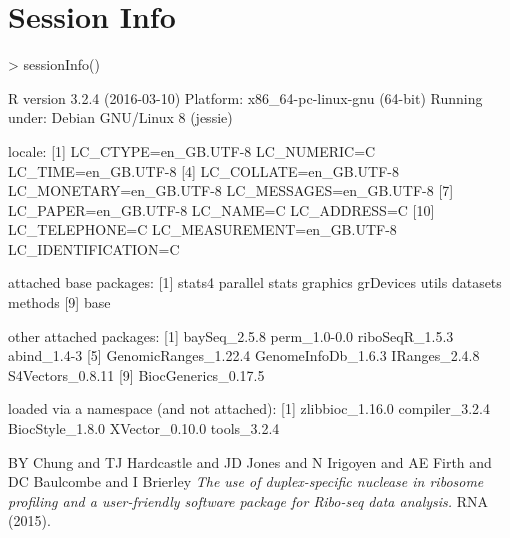 \documentclass[a4paper]{article}
\begin{document}
\section*{Session Info}

\begin{Schunk}
\begin{Sinput}
> sessionInfo()
\end{Sinput}
\begin{Soutput}
R version 3.2.4 (2016-03-10)
Platform: x86_64-pc-linux-gnu (64-bit)
Running under: Debian GNU/Linux 8 (jessie)

locale:
 [1] LC_CTYPE=en_GB.UTF-8       LC_NUMERIC=C               LC_TIME=en_GB.UTF-8       
 [4] LC_COLLATE=en_GB.UTF-8     LC_MONETARY=en_GB.UTF-8    LC_MESSAGES=en_GB.UTF-8   
 [7] LC_PAPER=en_GB.UTF-8       LC_NAME=C                  LC_ADDRESS=C              
[10] LC_TELEPHONE=C             LC_MEASUREMENT=en_GB.UTF-8 LC_IDENTIFICATION=C       

attached base packages:
[1] stats4    parallel  stats     graphics  grDevices utils     datasets  methods  
[9] base     

other attached packages:
[1] baySeq_2.5.8         perm_1.0-0.0         riboSeqR_1.5.3       abind_1.4-3         
[5] GenomicRanges_1.22.4 GenomeInfoDb_1.6.3   IRanges_2.4.8        S4Vectors_0.8.11    
[9] BiocGenerics_0.17.5 

loaded via a namespace (and not attached):
[1] zlibbioc_1.16.0 compiler_3.2.4  BiocStyle_1.8.0 XVector_0.10.0  tools_3.2.4    
\end{Soutput}
\end{Schunk}

\begin{thebibliography}{99}
 BY Chung and TJ Hardcastle and JD Jones and N Irigoyen and AE Firth and DC Baulcombe and I Brierley \textsl{The use of duplex-specific nuclease in ribosome profiling and a user-friendly software package for Ribo-seq data analysis.} RNA (2015).
\end{thebibliography}
\end{document}
